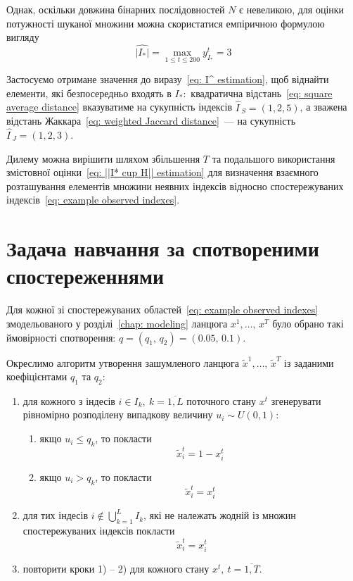 Однак, оскільки довжина бінарних послідовностей $N$ є невеликою, для оцінки потужності шуканої множини можна скористатися емпіричною формулою вигляду
\begin{equation*}
    \widehat{|I_*|}=\max\limits_{1\leqslant t \leqslant 200} y^t_{I_*} = 3
\end{equation*}

\newpage
Застосуємо отримане значення до виразу~\eqref{eq: I^ estimation}, щоб віднайти елементи, які безпосередньо входять в $I_*:$ квадратична відстань~\eqref{eq: square average distance} вказуватиме на сукупність індексів $\widehat{I\,}_S=(1,2,5)$, а зважена відстань Жаккара~\eqref{eq: weighted Jaccard distance}~--- на сукупність $\widehat{I\,}_J=(1,2,3)$.

Дилему можна вирішити шляхом збільшення $T$ та подальшого використання змістовної оцінки~\eqref{eq: ||I* cup H|| estimation} для визначення взаємного розташування елементів множини неявних індексів відносно спостережуваних індексів~\eqref{eq: example observed indexes}.

\section{Задача навчання за спотвореними спостереженнями}

Для кожної зі спостережуваних областей~\eqref{eq: example observed indexes} змодельованого у розділі~\ref{chap: modeling} ланцюга $x^1,\ldots,\,x^T$ було обрано такі ймовірності спотворення: $q = (q_1,\,q_2) = (0.05,\,0.1)$. 

Окреслимо алгоритм утворення зашумленого ланцюга $\widetilde{x}^1,\ldots,\,\widetilde{x}^T$ із заданими коефіцієнтами $q_1$ та $q_2:$

\begin{enumerate}
    \item для кожного з індесів $i \in I_k,\ k=\overline{1,L}$ поточного стану $x^t$ згенерувати рівномірно розподілену випадкову величину $u_i \sim U(0,1):$
    \begin{enumerate}
        \item якщо $u_i \leqslant q_k$, то покласти
        \begin{equation*}
            \widetilde{x}^{t}_i=1 - x^{t}_i
        \end{equation*} 
        \item якщо $u_i > q_k$, то покласти
        \begin{equation*}
            \widetilde{x}^{t}_i=x^{t}_i
        \end{equation*} 
    \end{enumerate}
    \item для тих індесів $i \notin \bigcup\limits_{k=1}^L I_k$, які не належать жодній із множин спостережуваних індексів покласти
    \begin{equation*}
        \widetilde{x}^{t}_i=x^{t}_i
    \end{equation*}
    \item повторити кроки 1) -- 2) для кожного стану $x^t,\ t=\overline{1,T}$.
\end{enumerate}

